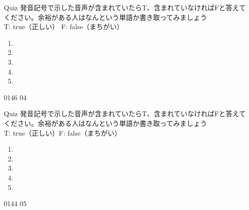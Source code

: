 \documentclass[aspectratio=169, xcolor={dvipsnames,table}]{beamer}
\begin{document}
\begin{frame}[plain]{Quiz }
  \large 発音記号で示した音声が含まれていたらT、含まれていなければFと答えてください。余裕がある人はなんという単語か書き取ってみましょう\\
  \hfill{}{\scriptsize T: true（正しい）\hspace{5pt} F: false（まちがい）}
  \begin{enumerate}
    \item \mbox{}\hspace{1\zw}

    \item \mbox{}\hspace{1\zw}

    \item \mbox{}\hspace{1\zw}

    \item \mbox{}\hspace{1\zw}

    \item \mbox{}\hspace{1\zw}
  \end{enumerate}

  \hfill{\tiny 0146}\,{\scriptsize {}\,04}
\end{frame}
\begin{frame}[plain]{Quiz }
  \large 発音記号で示した音声が含まれていたらT、含まれていなければFと答えてください。余裕がある人はなんという単語か書き取ってみましょう\\
  \hfill{}{\scriptsize T: true（正しい）\hspace{5pt}F: false（まちがい）}
  \begin{enumerate}
    \item \mbox{}\visible<2->{T}\hspace{1\zw}

    \item \mbox{}\hspace{1\zw}

    \item \mbox{}\visible<4->{F}\hspace{1\zw}

    \item \mbox{}\hspace{1\zw}

    \item \mbox{}\hspace{1\zw}
  \end{enumerate}

  \hfill{\tiny 0144}\,{\scriptsize {}\,05}
\end{frame}
\end{document}
